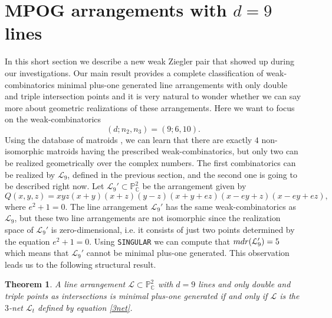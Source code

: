 \documentclass[12pt]{article}
\theoremstyle{plain}
\newtheorem{theorem}[thm]{Theorem}
\theoremstyle{definition}
\begin{document}
\section{MPOG arrangements with $d=9$ lines}
In this short section we describe a new weak Ziegler pair that showed up during our investigations.
Our main result provides a complete classification of weak-combinatorics minimal plus-one generated line arrangements with only double and triple intersection points and it is very natural to wonder whether we can say more about geometric realizations of these arrangements. Here we want to focus on the weak-combinatorics $$(d;n_{2},n_{3}) = (9;6,10).$$
Using the database of matroids \cite{mat}, we can learn that there are exactly $4$ non-isomorphic matroids having the prescribed weak-combinatorics, but only two can be realized geometrically over the complex numbers. The first combinatorics can be realized by $\mathcal{L}_{9}$, defined in the previous section, and the second one is going to be described right now.
Let $\mathcal{L}_{9}' \subset \mathbb{P}^{2}_{\mathbb{C}}$ be the arrangement given by
$$Q(x,y,z) =  xyz(x+y)(x+z)(y-z)(x+y+ez)(x-ey+z)(x-ey+ez),$$
where $e^{2}+1=0$. The line arrangement $\mathcal{L}_{9}'$ has the same weak-combinatorics as $\mathcal{L}_{9}$, but these two line arrangements are not isomorphic since the realization space of $\mathcal{L}_{9}'$ is zero-dimensional, i.e. it consists of just two points determined by the equation $e^{2}+1=0$. Using \verb}SINGULAR} we can compute that ${\rm mdr}(\mathcal{L}_{9}')=5$ which means that $\mathcal{L}_{9}'$ cannot be minimal plus-one generated. This observation leads us to the following structural result.
\begin{theorem}
A line arrangement $\mathcal{L} \subset \mathbb{P}^{2}_{\mathbb{C}}$ with $d=9$ lines and only double and triple points as intersections is minimal plus-one generated if and only if $\mathcal{L}$ is the $3$-net $\mathcal{L}_{t}$ defined by equation \eqref{3net}.    
\end{theorem}
\end{document}
